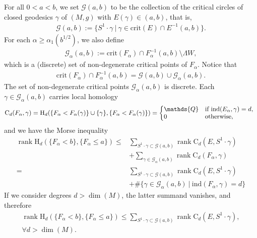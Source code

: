 \documentclass[reqno]{amsart}
\numberwithin{equation}{section}
\theoremstyle{personal}%
\theoremstyle{definition}
\newcommand{\Q}{\mathds{Q}}
\newcommand{\crit}{\mathrm{crit}}
\newcommand{\Hom}{\mathrm{H}}
\newcommand{\Loc}{\mathrm{C}}
\newcommand{\ind}{\mathrm{ind}}
\DeclareMathOperator{\rank}{\mathrm{rank}}
\begin{document}
For all $0< a<b$, we set $\mathcal G(a,b)$ to be the collection of the critical circles of closed geodesics $\gamma$ of $(M,g)$ with $E(\gamma)\in(a,b)$, that is,
\begin{align*}
\mathcal G(a,b)
:=
\big\{
S^1\cdot\gamma
\ \big|\ 
\gamma\in\crit(E)\cap E^{-1}(a,b)
\big\}.
\end{align*}
For each $\alpha\geq\alpha_1(b^{1/2})$, we also define 
\begin{align*}
\mathcal G_\alpha(a,b)
:=\crit(F_\alpha)\cap F_\alpha^{-1}(a,b)\setminus \Lambda W,
\end{align*}
which is a (discrete) set of non-degenerate critical points of $F_\alpha$.
Notice that
\begin{align*}
\crit(F_\alpha)\cap F_\alpha^{-1}(a,b) = \mathcal G(a,b) \cup \mathcal G_\alpha(a,b).
\end{align*}
The set of non-degenerate critical points $\mathcal G_\alpha(a,b)$ is discrete. Each $\gamma\in\mathcal G_\alpha(a,b)$ carries local homology
\begin{align*}
\Loc_d(F_\alpha,\gamma)
=
\Hom_d(\{F_\alpha<F_\alpha(\gamma)\}\cup\{\gamma\},\{F_\alpha<F_\alpha(\gamma)\})
=
\left\{
  \begin{array}{@{}ll}
    \Q &   \mbox{if }\ind(E_\alpha,\gamma)=d, \\ 
    0 &   \mbox{otherwise}, 
  \end{array}
\right.
\end{align*}
and we have the Morse inequality
\begin{align*}
\rank \Hom_d(\{F_\alpha<b\},\{F_\alpha\leq a\})
\leq &
\sum_{S^1\cdot\gamma\subset\mathcal G(a,b)} \!\!\!\!\!\!\!\rank\Loc_d(E,S^1\cdot\gamma)\\
& +
\sum_{\gamma\in\mathcal G_\alpha(a,b)} \!\!\!\!\!\rank\Loc_d(F_\alpha,\gamma)\\
= &
\sum_{S^1\cdot\gamma\subset\mathcal G(a,b)} \!\!\!\!\!\!\!\rank\Loc_d(E,S^1\cdot\gamma)\\
& +
\#
\big\{
\gamma\in\mathcal G_\alpha(a,b)\ \big|\ \ind(F_\alpha,\gamma)= d
\big\}
\end{align*}
If we consider degrees $d>\dim(M)$, the latter summand vanishes, and therefore
\begin{equation*}
\begin{split}
\rank \Hom_d(\{F_\alpha<b\},\{F_\alpha\leq a\})
\leq 
\sum_{S^1\cdot\gamma\subset\mathcal G(a,b)} \!\!\!\!\!\!\!\rank\Loc_d(E,S^1\cdot\gamma),
\\
\forall d>\dim(M).
\end{split}
\end{equation*}
\end{document}
